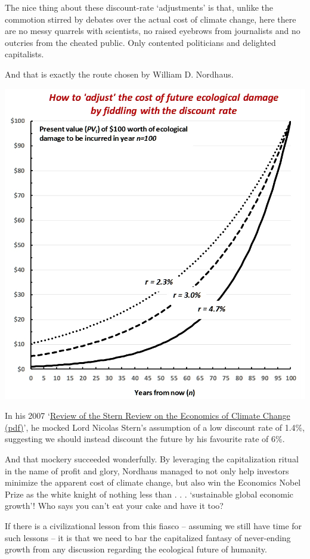 \documentclass[
]{book}
\begin{document}
The nice thing about these discount-rate `adjustments' is that, unlike the commotion stirred by debates over the actual cost of climate change, here there are no messy quarrels with scientists, no raised eyebrows from journalists and no outcries from the cheated public. Only contented politicians and delighted capitalists.

And that is exactly the route chosen by William D. Nordhaus.

\includegraphics{fig/discount_rate.jpg}

In his 2007 `\href{pdf/Nordhaus_2007_Review_of_Stern.pdf}{Review of the Stern Review on the Economics of Climate Change (pdf)}', he mocked Lord Nicolas Stern's assumption of a low discount rate of 1.4\%, suggesting we should instead discount the future by his favourite rate of 6\%.

And that mockery succeeded wonderfully. By leveraging the capitalization ritual in the name of profit and glory, Nordhaus managed to not only help investors minimize the apparent cost of climate change, but also win the Economics Nobel Prize as the white knight of nothing less than . . . `sustainable global economic growth'! Who says you can't eat your cake and have it too?

If there is a civilizational lesson from this fiasco -- assuming we still have time for such lessons -- it is that we need to bar the capitalized fantasy of never-ending growth from any discussion regarding the ecological future of humanity.
\end{document}

